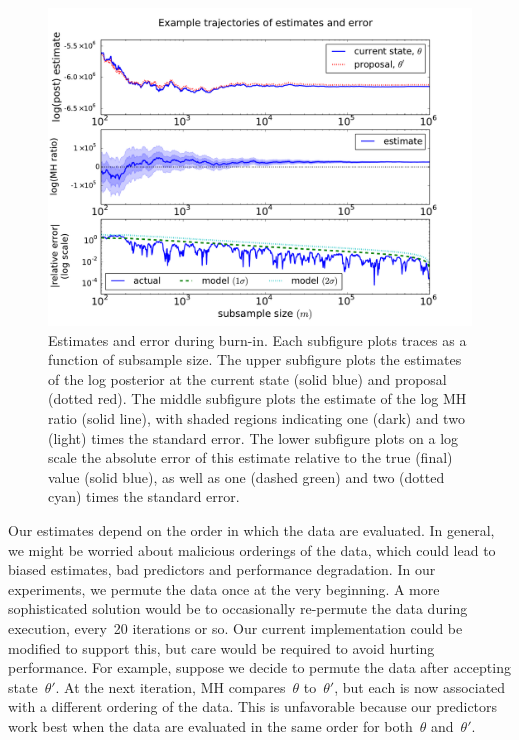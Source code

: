 \documentclass[angelino.tex]{subfiles}
\begin{document}
\begin{figure}[t!]
\begin{center}
\includegraphics[width=\textwidth]{figs/mix-ic-traces-pair.pdf}
\end{center}
\caption{Estimates and error during burn-in.
Each subfigure plots traces as a function of subsample size.
The upper subfigure plots the estimates of the log posterior at
the current state (solid blue) and proposal (dotted red).
The middle subfigure plots the estimate of the log MH ratio (solid line),
with shaded regions indicating one (dark) and two (light) times the standard error.
The lower subfigure plots on a log scale the absolute error of this estimate
relative to the true (final) value (solid blue),
as well as one (dashed green) and two (dotted cyan) times the standard error.
}
\label{fig:pair-ic}
\end{figure}

Our estimates depend on the order in which the data are evaluated.
In general, we might be worried about malicious orderings of the data,
which could lead to biased estimates, bad predictors and performance degradation.
In our experiments, we permute the data once at the very beginning.
A more sophisticated solution would be to occasionally re-permute the data
during execution, \eg every~20 iterations or so.
Our current implementation could be modified to support this,
but care would be required to avoid hurting performance.
For example, suppose we decide to permute the data after accepting state~$\theta'$.
At the next iteration, MH compares~$\theta$ to~$\theta'$,
but each is now associated with a different ordering of the data.
This is unfavorable because our predictors work best when the data are
evaluated in the same order for both~$\theta$ and~$\theta'$.
\end{document}
